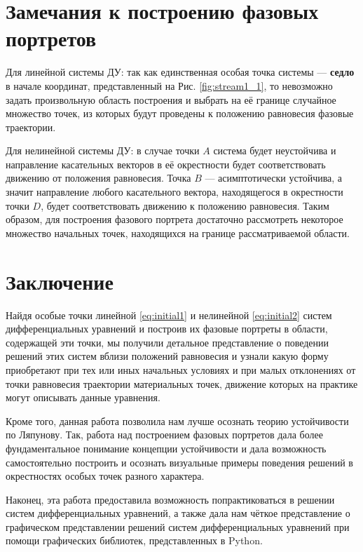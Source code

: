 \documentclass{article}
\begin{document}
\newpage


\section{Замечания к построению фазовых портретов}
Для линейной системы ДУ: так как единственная особая точка системы — \textbf{седло} в начале координат, представленный на Рис. \ref{fig:stream1_1}, то невозможно задать произвольную область построения и выбрать на её границе случайное множество точек, из которых будут проведены к положению равновесия фазовые траектории. \par
Для нелинейной системы ДУ: в случае точки $A$ система будет неустойчива и  направление касательных векторов в её окрестности будет соответствовать движению от положения равновесия. Точка $B$ — асимптотически устойчива, а значит направление любого касательного вектора, находящегося в окрестности точки $D$, будет соответствовать движению к положению равновесия. Таким образом, для построения фазового портрета достаточно рассмотреть некоторое множество начальных точек, находящихся на границе рассматриваемой области.
\vspace{1.5cm}

\section{Заключение}
Найдя особые точки линейной \ref{eq:initial1} и нелинейной \ref{eq:initial2} систем дифференциальных уравнений и построив их фазовые портреты в области, содержащей эти точки, мы получили детальное представление о поведении решений этих систем вблизи положений равновесия и узнали какую форму  приобретают при тех или иных начальных условиях и при малых отклонениях от точки равновесия траектории материальных точек, движение которых на практике могут описывать данные уравнения.\par
Кроме того, данная работа позволила нам лучше осознать теорию устойчивости по Ляпунову. Так, работа над построением фазовых портретов дала более фундаментальное понимание концепции устойчивости и дала возможность самостоятельно построить и осознать визуальные примеры поведения решений в окрестностях особых точек разного характера.\par
Наконец, эта работа предоставила возможность попрактиковаться в решении систем дифференциальных уравнений, а также дала нам чёткое представление о графическом представлении решений систем дифференциальных уравнений при помощи графических библиотек, представленных в Python.
\newpage
\end{document}
